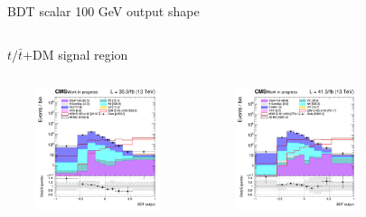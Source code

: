 \documentclass[8pt]{beamer}
\begin{document}
\begin{frame}{BDT scalar 100 GeV output shape}
\begin{columns}
\begin{column}{1.09\textwidth}
\begin{block}{\centering $t/\bar t$+DM signal region}\end{block} \vspace{10pt}
\end{column}
\end{columns} \vspace{-24pt}
\begin{columns}
		\begin{column}{0.33\textwidth}
			\begin{center}
			\begin{block}{}\end{block}	
     			\includegraphics[width=1.0\textwidth, height=100pt]{figs/2016/SmearSR-ttDM-scalar100/log_cratio_ST_topCR_ll_BDT_ttDM100_ST_BDT_output_scalar100_customBinsAttempt7.png}
    		\end{center}		
		\end{column} 
		\begin{column}{0.33\textwidth}
			\begin{center}
			\begin{block}{}\end{block}	
     			\includegraphics[width=1.0\textwidth, height=100pt]{figs/2017/SmearSR-ttDM-scalar100/log_cratio_ST_topCR_ll_BDT_ttDM100_ST_BDT_output_scalar100_customBinsAttempt7.png}
    		\end{center}		
		\end{column} 
		\begin{column}{0.33\textwidth}
			\begin{center}

\end{center}
\end{column}
\end{columns}
\end{frame}
\end{document}
